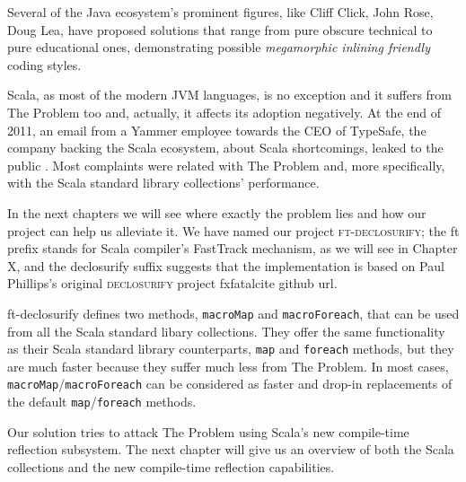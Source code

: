 Several of the Java ecosystem's prominent figures, like Cliff Click, John Rose,
Doug Lea, have proposed solutions that range from pure obscure technical to pure
educational ones, demonstrating possible \emph{megamorphic inlining friendly}
coding styles.

Scala, as most of the modern JVM languages, is no exception and it suffers from
The Problem too and, actually, it affects its adoption negatively. At the end of
2011, an email from a Yammer employee towards the CEO of TypeSafe, the company
backing the Scala ecosystem, about Scala shortcomings, leaked to the public
. Most complaints were
related with The Problem and, more specifically, with the Scala standard
library collections' performance. 

In the next chapters we will see where exactly the problem lies and how
our project can help us alleviate it. We have named our project
\textsc{ft-declosurify}; the ft prefix stands for Scala compiler's FastTrack
mechanism, as we will see in Chapter X, and the declosurify suffix suggests that
the implementation is based on Paul Phillips's original \textsc{declosurify} project
fxfatal{cite github url}. 

ft-declosurify defines two methods, \texttt{macroMap} and \texttt{macroForeach}, that can be used
from all the Scala standard libary collections. They offer the same
functionality as their Scala standard library counterparts, \texttt{map} and \texttt{foreach}
methods, but they are much faster because they suffer much less from The
Problem. In most cases, \texttt{macroMap}/\texttt{macroForeach} can be considered as faster and
drop-in replacements of the default \texttt{map}/\texttt{foreach} methods.

Our solution tries to attack The Problem using Scala's new compile-time
reflection subsystem. The next chapter will give us an overview of both the
Scala collections and the new compile-time reflection capabilities.
